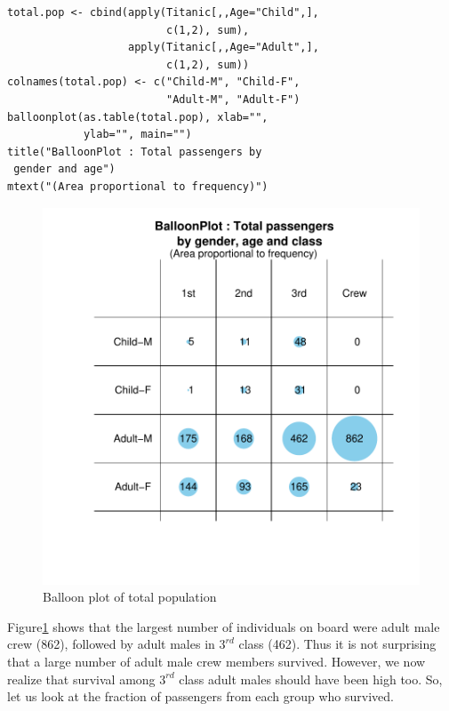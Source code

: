 \documentclass[a4paper]{report}
\begin{document}
\begin{article}
{\small
\begin{verbatim}
total.pop <- cbind(apply(Titanic[,,Age="Child",],
                         c(1,2), sum), 
                   apply(Titanic[,,Age="Adult",], 
                         c(1,2), sum))
colnames(total.pop) <- c("Child-M", "Child-F", 
                         "Adult-M", "Adult-F")
balloonplot(as.table(total.pop), xlab="",
            ylab="", main="")
title("BalloonPlot : Total passengers by
 gender and age")
mtext("(Area proportional to frequency)")
\end{verbatim}
 }

\begin{figure}[h]
\includegraphics[width=\textwidth]{TotalPop.pdf}
\vspace{-0.65in}
\caption{\label{figure:Total.Pop}
Balloon plot of total population}
\end{figure}

\noindent 
Figure\ref{figure:Total.Pop} shows that the largest number of
individuals on board were adult male crew (862), followed by adult males in
$3^{rd}$ class (462).  Thus it is not surprising that a large number
of adult male crew members survived.  However, we now realize that
survival among $3^{rd}$ class adult males should have been high too.
So, let us look at the fraction of passengers from each group who
survived.


\end{article}
\end{document}
